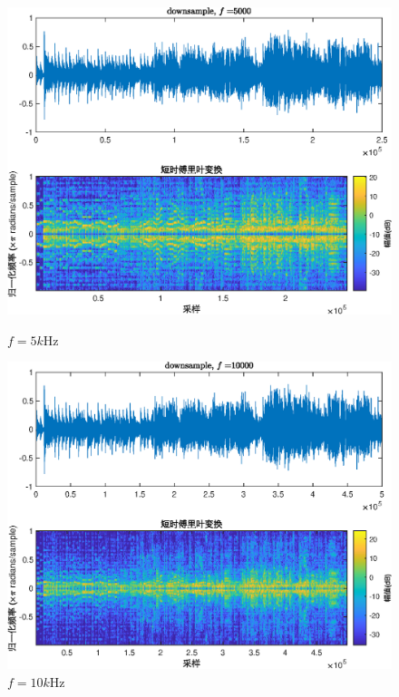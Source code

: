 \documentclass[fontset=macnew]{article}
\begin{document}
\begin{figure}[htbp]
	\centering
	\begin{minipage}[b]{0.32\linewidth}
		\includegraphics[width=\linewidth]{downsample_5000.eps}
		\caption*{$f=5k$Hz}
		\label{down5}
	\end{minipage}
	\begin{minipage}[b]{0.32\linewidth}
		\includegraphics[width=\linewidth]{downsample_10000.eps}
		\caption*{$f=10k$Hz}
		\label{down10}
	\end{minipage}
	\begin{minipage}[b]{0.32\linewidth}

\end{minipage}
\end{figure}
\end{document}
